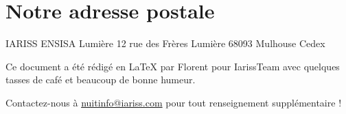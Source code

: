 \documentclass[12pt, a4paper]{article}
\newcommand{\espace}{\vspace{.8cm}}
\newcommand{\authors}{Florent}
\begin{document}
\espace{}
\section*{Notre adresse postale}
	
IARISS
ENSISA Lumière
12 rue des Frères Lumière
68093 Mulhouse Cedex


\espace\vfill{}
Ce document a été rédigé en \LaTeX{} par \authors{} pour IarissTeam avec quelques tasses de café et beaucoup de bonne humeur.

Contactez-nous à \href{mailto:nuitinfo@iariss.com}{nuitinfo@iariss.com} pour tout renseignement supplémentaire !
\end{document}
